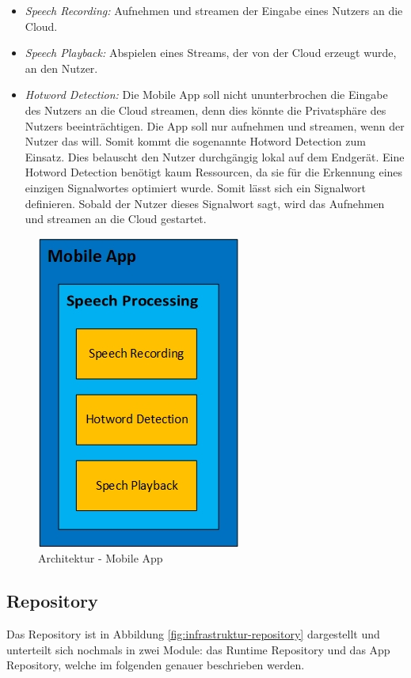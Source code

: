 \begin{itemize}
	\item \textsl{Speech Recording:} Aufnehmen und streamen der Eingabe eines Nutzers an die Cloud.
	\item \textsl{Speech Playback:} Abspielen eines Streams, der von der Cloud erzeugt wurde, an den Nutzer.
	\item \textsl{Hotword Detection:} Die Mobile App soll nicht ununterbrochen die Eingabe des Nutzers an die Cloud streamen, denn dies könnte die Privatsphäre des Nutzers beeinträchtigen. Die App soll nur aufnehmen und streamen, wenn der Nutzer das will. Somit kommt die sogenannte \glqq Hotword Detection\grqq{} zum Einsatz. Dies belauscht den Nutzer durchgängig lokal auf dem Endgerät. Eine Hotword Detection benötigt kaum Ressourcen, da sie für die Erkennung eines einzigen Signalwortes optimiert wurde. Somit lässt sich ein Signalwort definieren. Sobald der Nutzer dieses Signalwort sagt, wird das Aufnehmen und streamen an die Cloud gestartet. 
\end{itemize}

\begin{figure}[h!]
	\centering
	\includegraphics[width=0.3\linewidth]{Picture/Infrastruktur-App.jpg}
	\caption[Architektur - Mobile App]{Architektur - Mobile App}
	\label{fig:infrastruktur-app}
\end{figure}

\subsection{Repository}
Das Repository ist in Abbildung \ref{fig:infrastruktur-repository} dargestellt und unterteilt sich nochmals in zwei Module: das Runtime Repository und das App Repository, welche im folgenden genauer beschrieben werden.

